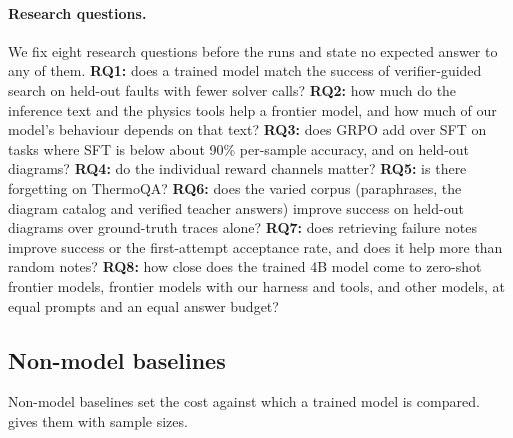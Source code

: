 \paragraph{Research questions.}
We fix eight research questions before the runs and state no expected answer to any of them.
\textbf{RQ1:} does a trained model match the success of verifier-guided search on held-out faults with fewer solver calls?
\textbf{RQ2:} how much do the inference text and the physics tools help a frontier model, and how much of our model's behaviour depends on that text?
\textbf{RQ3:} does GRPO add over SFT on tasks where SFT is below about 90\% per-sample accuracy, and on held-out diagrams?
\textbf{RQ4:} do the individual reward channels matter?
\textbf{RQ5:} is there forgetting on ThermoQA?
\textbf{RQ6:} does the varied corpus (paraphrases, the diagram catalog and verified teacher answers) improve success on held-out diagrams over ground-truth traces alone?
\textbf{RQ7:} does retrieving failure notes improve success or the first-attempt acceptance rate, and does it help more than random notes?
\textbf{RQ8:} how close does the trained 4B model come to zero-shot frontier models, frontier models with our harness and tools, and other models, at equal prompts and an equal answer budget?

\subsection{Non-model baselines}\label{sec:baselines}

Non-model baselines set the cost against which a trained model is compared.  gives them with sample sizes.

\begin{table}[tbp]
\centering

\caption{Non-model baselines on generated rows (simulation, seed 0). Repair: all rows of each split ($n$ is the split size). Design:
 sites, of which  have a heat demand; ``within'' is the share of sites whose best design is within
\% of the reference. Audit:  in-distribution and  held-out-topology plants.}
\label{tab:baselines}
\end{table}

